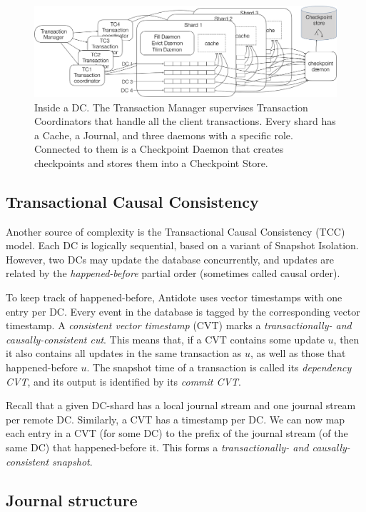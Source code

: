 \documentclass[11pt]{article}
\begin{document}
\begin{figure}[tp]
  \centering
  \includegraphics[width=1\textwidth]{figures/insidedc.png}
  \caption{Inside a DC. The Transaction Manager supervises Transaction Coordinators that handle all the client transactions. Every shard has a Cache, a Journal, and three daemons with a specific role. Connected to them is a Checkpoint Daemon that creates checkpoints and stores them into a Checkpoint Store.}
  \label{fig:insidedc}
\end{figure}

\subsection{Transactional Causal Consistency}
\label{sec:tcc}

Another source of complexity is the Transactional Causal Consistency
(TCC) model.
Each DC is logically sequential, based on a variant of Snapshot
Isolation.
However, two DCs may update the database concurrently, and updates are
related by the \emph{happened-before} partial order (sometimes called
causal order).

To keep track of happened-before, Antidote uses vector
timestamps with one entry per DC\@.
Every event in the database is tagged by the corresponding vector
timestamp.
A \emph{consistent vector timestamp} (CVT) marks a \emph{transactionally- and
causally-consistent cut}.
This means that, if a CVT contains some update $u$, then it also contains all
updates in the same transaction as $u$, as well as those that
happened-before $u$. 
The snapshot time of a transaction is called its \emph{dependency
CVT}, and its output is identified by its \emph{commit CVT}.

Recall that a given DC-shard has a local journal stream and one journal
stream per remote DC\@.
Similarly, a CVT has a timestamp per DC\@.
We can now map each entry in a CVT (for some DC) to the prefix of the
journal stream (of the same DC) that happened-before it.
This forms a \emph{transactionally- and causally-consistent snapshot}.


\subsection{Journal structure}
\label{sec:journal}
\end{document}
